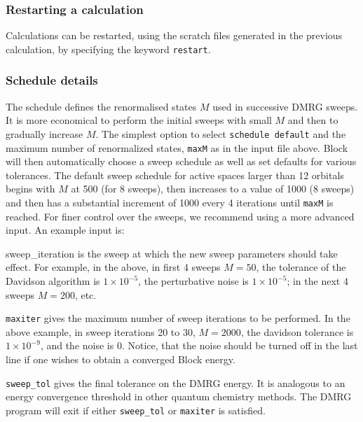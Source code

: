 \documentclass[letterpaper,12pt,aps, pra]{revtex4-1}
\begin{document}
\subsubsection{Restarting a calculation}
Calculations can be restarted, using the scratch files generated in the
previous calculation, by specifying the keyword \texttt{restart}.

\subsubsection{Schedule details}\label{sec:AppSched}
The schedule defines the renormalised states $M$ used in successive DMRG
sweeps. It is more economical to perform the initial sweeps with small $M$ and
then to gradually increase $M$. The simplest option to select \texttt{schedule
default} and the maximum number of renormalized states, \texttt{maxM} as in the
input file above. Block will then automatically choose a sweep schedule as well
as set defaults for various tolerances.  The default sweep schedule for active
spaces larger than 12 orbitals begins with $M$ at 500 (for 8 sweeps), then increases
to a value of 1000 (8 sweeps) and then has a substantial increment of 1000
every 4 iterations until \texttt{maxM} is reached. For finer
control over the sweeps, we recommend using a more advanced input. An example
input is:

sweep\_iteration is the sweep at which the new sweep parameters should take
effect. For example, in the above, in  first 4 sweeps $M=50$, the tolerance of
the Davidson algorithm is $1\times 10^{-5}$, the perturbative  noise is $1
\times 10^{-5}$; in the next 4 sweeps $M=200$, etc.

\texttt{maxiter} gives the maximum number of sweep iterations to be performed.
In the above example, in sweep iterations 20 to 30, $M=2000$, the davidson
tolerance is $1\times 10^{-9}$, and the noise is 0. Notice, that the noise
should be turned off in the last line if one wishes to obtain a converged Block
energy.

\texttt{sweep\_tol} gives the final tolerance on the DMRG energy. It is
analogous to an energy convergence threshold in other quantum chemistry
methods.  The DMRG program will exit if either \texttt{sweep\_tol} or
\texttt{maxiter} is satisfied.
\end{document}
